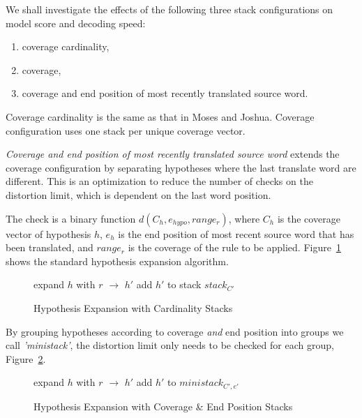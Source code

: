 \documentclass[11pt]{article}
\begin{document}
We shall investigate the effects of the following three stack configurations on model score and decoding speed:
\begin{enumerate}
  \item \vspace{-2 mm} coverage cardinality,
  \item \vspace{-2 mm} coverage,
  \item \vspace{-2 mm} coverage and end position of most recently translated source word.
\end{enumerate}
Coverage cardinality is the same as that in Moses and Joshua. Coverage configuration uses one stack per unique coverage vector.

\emph{Coverage and end position of most recently translated source word} extends the coverage configuration by separating hypotheses where the last translate word are different. This is an optimization to reduce the number of checks on the distortion limit, which is dependent on the last word position. 

The check is a binary function $d(C_{h}, e_{hypo}, range_r)$, where $C_{h}$ is the coverage vector of hypothesis $h$, $e_{h}$ is the end position of most recent source word that has been translated, and $range_r$ is the coverage of the rule to be applied. Figure~\ref{algo:Hypothesis Expansion with Unsorted Stack} shows the standard hypothesis expansion algorithm.
\begin{figure} [h]
\begin{algorithmic}
	\STATE expand $h$ with $r$ $\rightarrow$ $h'$
	\STATE add $h'$ to stack $stack_{C'}$
      \ENDIF
  \ENDFOR %
\ENDFOR %
\end{algorithmic}
\caption{Hypothesis Expansion with Cardinality Stacks}
\label{algo:Hypothesis Expansion with Unsorted Stack}
\end{figure}

By grouping hypotheses according to coverage \emph{and} end position into groups we call \emph{'ministack'}, the distortion limit only needs to be checked for each group, Figure~\ref{algo:Hypothesis Expansion with Sorted Stack}. 
\begin{figure} [h]
\begin{algorithmic}
	\STATE expand $h$ with $r$ $\rightarrow$ $h'$
	\STATE add $h'$ to $ministack_{C',e'}$
      \ENDFOR
    \ENDIF
  \ENDFOR %
\ENDFOR %
\end{algorithmic}
\caption{Hypothesis Expansion with Coverage \& End Position Stacks}
\label{algo:Hypothesis Expansion with Sorted Stack}
\end{figure}
\end{document}
